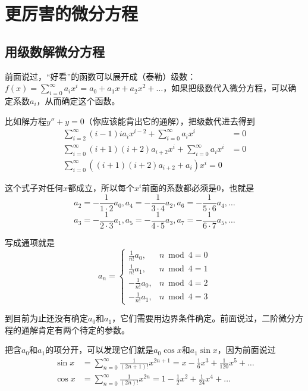 \chapter{更厉害的微分方程}
\section{用级数解微分方程}
前面说过，“好看”的函数可以展开成（泰勒）级数：$f(x)=\sum_{i=0}^{\infty} a_i x^i=a_0+a_1 x+a_2 x^2+\dots$，如果把级数代入微分方程，可以确定系数$a_i$，从而确定这个函数。

比如解方程$y''+y=0$（你应该能背出它的通解），把级数代进去得到
\begin{align*}
\sum_{i=2}^{\infty} (i-1)i a_i x^{i-2}+\sum_{i=0}^{\infty} a_i x^i&=0 \\
\sum_{i=0}^{\infty} (i+1)(i+2) a_{i+2} x^i+\sum_{i=0}^{\infty} a_i x^i&=0 \\
\sum_{i=0}^{\infty} ((i+1)(i+2) a_{i+2}+a_i) x^i=0
\end{align*}

这个式子对任何$x$都成立，所以每个$x^i$前面的系数都必须是$0$，也就是
\begin{equation*}
a_2=-\frac{1}{1 \cdot 2} a_0, a_4=-\frac{1}{3 \cdot 4} a_2, a_6=-\frac{1}{5 \cdot 6} a_4, \dots
\end{equation*}
\begin{equation*}
a_3=-\frac{1}{2 \cdot 3} a_1, a_5=-\frac{1}{4 \cdot 5} a_3, a_7=-\frac{1}{6 \cdot 7} a_5, \dots
\end{equation*}

写成通项就是
\begin{equation*}
a_n=\begin{cases}
\frac{1}{n!} a_0, &n \bmod 4=0 \\
\frac{1}{n!} a_1, &n \bmod 4=1 \\
-\frac{1}{n!} a_0, &n \bmod 4=2 \\
-\frac{1}{n!} a_1, &n \bmod 4=3
\end{cases}
\end{equation*}

到目前为止还没有确定$a_0$和$a_1$，它们需要用边界条件确定。前面说过，二阶微分方程的通解肯定有两个待定的参数。

把含$a_0$和$a_1$的项分开，可以发现它们就是$a_0 \cos x$和$a_1 \sin x$，因为前面说过
\begin{align*}
\sin x&=\sum_{n=0}^{\infty}\frac{1}{(2n+1)!}x^{2n+1}=x-\frac{1}{6}x^3+\frac{1}{120}x^5+\dots \\
\cos x&=\sum_{n=0}^{\infty}\frac{1}{(2n)!}x^{2n}=1-\frac{1}{2}x^2+\frac{1}{24}x^4+\dots
\end{align*}

